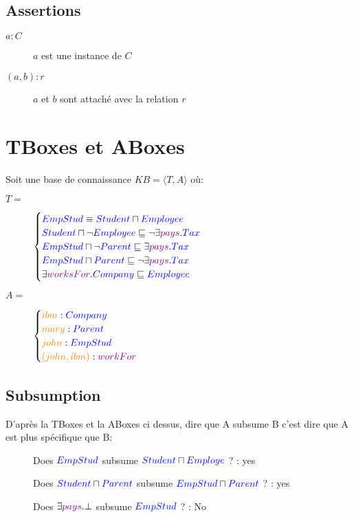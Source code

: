 \subsection{Assertions}
\begin{description}
\item[$a : C$] $a$ est une instance de $C$
\item[$(a,b) : r$] $a$ et $b$ sont attaché avec la relation $r$
\end{description}
\pagebreak
\section{TBoxes et ABoxes}
Soit une base de connaissance $KB = \langle T,A \rangle$ où:
\begin{description}
\item[$T = $] 
$\begin{cases}
\textcolor{blue}{EmpStud} \equiv \textcolor{blue}{Student} \sqcap \textcolor{blue}{Employee} \\
\textcolor{blue}{Student} \sqcap \neg \textcolor{blue}{Employee} \sqsubseteq \neg \exists  \textcolor{violet}{pays}.\textcolor{blue}{Tax} \\
\textcolor{blue}{EmpStud} \sqcap \neg \textcolor{blue}{Parent} \sqsubseteq \exists  \textcolor{violet}{pays}.\textcolor{blue}{Tax} \\
\textcolor{blue}{EmpStud} \sqcap \textcolor{blue}{Parent} \sqsubseteq \neg \exists \textcolor{violet}{pays}.\textcolor{blue}{Tax} \\
\exists \textcolor{violet}{worksFor}.\textcolor{blue}{Company} \sqsubseteq \textcolor{blue}{Employee}
\end{cases}$
\item[$A = $]
$\begin{cases}
\textcolor{orange}{ibm}: \textcolor{blue}{Company} \\
\textcolor{orange}{mary} : \textcolor{blue}{Parent} \\
\textcolor{orange}{john}: \textcolor{blue}{EmpStud} \\
\textcolor{orange}{(john,ibm)}:\textcolor{violet}{workFor} \\
\end{cases}$
\end{description}

\subsection{Subsumption}
D'après la TBoxes et la ABoxes ci dessus, dire que A subsume B c'est dire que A est plus spécifique que B:
\begin{description}
\item[] Does $\textcolor{blue}{EmpStud}$ subsume $\textcolor{blue}{Student} \sqcap \textcolor{blue}{Employe}$ ? : yes
\item[] Does $\textcolor{blue}{Student} \sqcap \textcolor{blue}{Parent}$ subsume $\textcolor{blue}{EmpStud} \sqcap \textcolor{blue}{Parent}$ ? : yes
\item[] Does $\exists \textcolor{violet}{pays}.\bot$ subsume $\textcolor{blue}{EmpStud}$ ? : No
\end{description}

